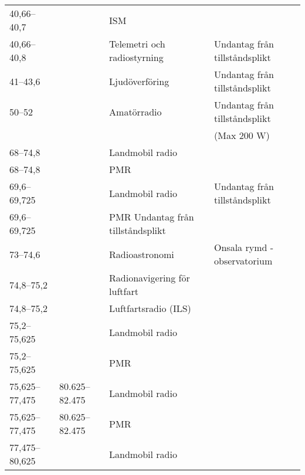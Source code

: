 \begin{landscape}
\begin{longtable}{llll}
	40,66--40,7        &                    & ISM                                   &                                \\
	40,66--40,8        &                    & Telemetri och radiostyrning           & Undantag från tillståndsplikt  \\
	41--43,6           &                    & Ljudöverföring                        & Undantag från tillståndsplikt  \\
	50--52             &                    & Amatörradio                           & Undantag från tillståndsplikt  \\
	                   &                    &                                       & (Max 200 W)                    \\
	68--74,8           &                    & Landmobil radio                       &                                \\
	68--74,8           &                    & PMR                                   &                                \\
	69,6--69,725       &                    & Landmobil radio                       & Undantag från tillståndsplikt  \\
	69,6--69,725       &                    & PMR	Undantag från tillståndsplikt   &                                \\
	73--74,6           &                    & Radioastronomi                        & Onsala rymd - observatorium    \\
	74,8--75,2         &                    & Radionavigering för luftfart          &                                \\
	74,8--75,2         &                    & Luftfartsradio (ILS)                  &                                \\
	75,2--75,625       &                    & Landmobil radio                       &                                \\
	75,2--75,625       &                    & PMR                                   &                                \\
	75,625--77,475     & 80.625--82.475     & Landmobil radio                       &                                \\
	75,625--77,475     & 80.625--82.475     & PMR                                   &                                \\
	77,475--80,625     &                    & Landmobil radio                       &                                \\

\end{longtable}
\end{landscape}
